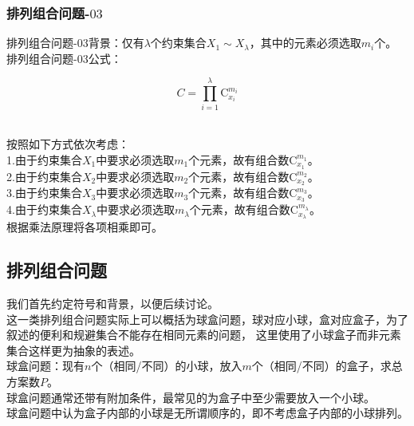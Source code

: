 \documentclass[UTF8]{ctexart}
\newcommand{\rnum}[1]{\uppercase\expandafter{\romannumeral #1\relax}}
\begin{document}
\subsubsection{排列组合问题\rnum{2}-$03$}
    排列组合问题\rnum{2}-$03$背景：仅有$\lambda$个约束集合$X_1\sim X_\lambda$，其中的元素必须选取$m_i$个。\\[3mm]
    排列组合问题\rnum{2}-$03$公式：
    \begin{large}
        \begin{equation*}
            C=\prod_{i=1}^{\lambda}\mathrm{C}_{x_i}^{m_i}
        \end{equation*}
    \end{large}\\
    按照如下方式依次考虑：\\[3mm]
    1.由于约束集合$X_1$中要求必须选取$m_1$个元素，故有组合数$\mathrm{C}_{x_1}^{m_1}$。\\[3mm]
    2.由于约束集合$X_2$中要求必须选取$m_2$个元素，故有组合数$\mathrm{C}_{x_2}^{m_2}$。\\[3mm]
    3.由于约束集合$X_3$中要求必须选取$m_3$个元素，故有组合数$\mathrm{C}_{x_3}^{m_3}$。\\[3mm]
    4.由于约束集合$X_\lambda$中要求必须选取$m_\lambda$个元素，故有组合数$\mathrm{C}_{x_\lambda}^{m_\lambda}$。\\[3mm]
    根据乘法原理将各项相乘即可。

\newpage

\subsection{排列组合问题\rnum{3}}
    我们首先约定符号和背景，以便后续讨论。\\[3mm]
    这一类排列组合问题实际上可以概括为球盒问题，球对应小球，盒对应盒子，为了叙述的便利和规避集合不能存在相同元素的问题，
    这里使用了小球盒子而非元素集合这样更为抽象的表述。\\[3mm]
    球盒问题：现有$n$个（相同/不同）的小球，放入$m$个（相同/不同）的盒子，求总方案数$P$。\\[3mm]
    球盒问题通常还带有附加条件，最常见的为盒子中至少需要放入一个小球。\\[3mm]
    球盒问题中认为盒子内部的小球是无所谓顺序的，即不考虑盒子内部的小球排列。
\end{document}
